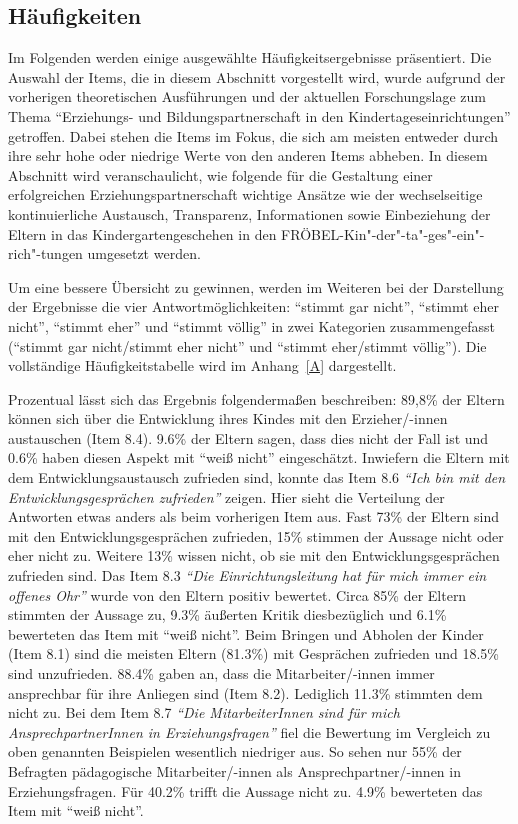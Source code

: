 \documentclass[12pt,a4paper]{article}
\begin{document}
\subsection{Häufigkeiten} 

Im Folgenden werden einige ausgewählte Häufigkeitsergebnisse präsentiert. Die Auswahl der Items, die in diesem Abschnitt vorgestellt wird, wurde aufgrund der vorherigen theoretischen Ausführungen und der aktuellen Forschungslage zum Thema "`Erziehungs- und Bildungspartnerschaft in den Kindertageseinrichtungen"' getroffen. Dabei stehen die Items im Fokus, die sich am meisten entweder durch ihre sehr hohe oder niedrige Werte von den anderen Items abheben. In diesem Abschnitt wird veranschaulicht, wie folgende für die Gestaltung einer erfolgreichen Erziehungspartnerschaft wichtige Ansätze wie der wechselseitige kontinuierliche Austausch, Transparenz, Informationen sowie Einbeziehung der Eltern in das Kindergartengeschehen in den FRÖBEL-Kin"-der"-ta"-ges"-ein"-rich"-tungen umgesetzt werden.

	Um eine bessere Übersicht zu gewinnen, werden im Weiteren bei der Darstellung der Ergebnisse die vier Antwortmöglichkeiten: "`stimmt gar nicht"', "`stimmt eher nicht"', "`stimmt eher"' und "`stimmt völlig"' in zwei Kategorien zusammengefasst ("`stimmt gar nicht/stimmt eher nicht"' und "`stimmt eher/stimmt völlig"'). Die vollständige Häufigkeitstabelle wird im Anhang~\ref{A} dargestellt.
	
	Prozentual lässt sich das Ergebnis folgendermaßen beschreiben: 89,8\% der Eltern können sich über die Entwicklung ihres Kindes mit den Erzieher/-innen austauschen (Item 8.4). 9.6\% der Eltern sagen, dass dies nicht der Fall ist und  0.6\% haben diesen Aspekt mit "`weiß nicht"' eingeschätzt.  Inwiefern die Eltern mit dem Entwicklungsaustausch zufrieden sind, konnte das Item 8.6 \textit{"`Ich bin mit den Entwicklungsgesprächen zufrieden"'} zeigen. Hier sieht die Verteilung der Antworten etwas anders als beim vorherigen Item aus. Fast 73\% der Eltern sind mit den Entwicklungsgesprächen zufrieden, 15\% stimmen der Aussage nicht oder eher nicht zu. Weitere 13\% wissen nicht, ob sie mit den Entwicklungsgesprächen zufrieden sind. Das Item 8.3 \textit{"`Die Einrichtungsleitung hat für mich immer ein offenes Ohr"'} wurde von den Eltern positiv bewertet. Circa 85\% der Eltern stimmten der Aussage zu, 9.3\% äußerten Kritik diesbezüglich und 6.1\% bewerteten das Item mit "`weiß nicht"'. Beim Bringen und Abholen der Kinder (Item 8.1) sind die meisten Eltern (81.3\%) mit Gesprächen zufrieden und 18.5\% sind unzufrieden. 88.4\% gaben an, dass die Mitarbeiter/-innen immer ansprechbar für ihre Anliegen sind (Item 8.2). Lediglich 11.3\% stimmten dem nicht zu. Bei dem Item 8.7 \textit{"`Die MitarbeiterInnen sind für mich AnsprechpartnerInnen in Erziehungsfragen"'} fiel die Bewertung im Vergleich zu oben genannten Beispielen wesentlich niedriger aus. So sehen nur 55\% der Befragten pädagogische Mitarbeiter/-innen als Ansprechpartner/-innen in Erziehungsfragen. Für 40.2\% trifft die Aussage nicht zu. 4.9\% bewerteten das Item mit "`weiß nicht"'.
	
\end{document}
